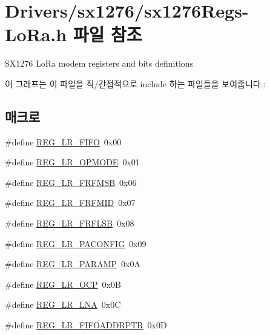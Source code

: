 \hypertarget{sx1276_regs-_lo_ra_8h}{}\section{Drivers/sx1276/sx1276\+Regs-\/\+Lo\+Ra.h 파일 참조}
\label{sx1276_regs-_lo_ra_8h}


S\+X1276 Lo\+Ra modem registers and bits definitions  


이 그래프는 이 파일을 직/간접적으로 include 하는 파일들을 보여줍니다.\+:
\subsection*{매크로}
\begin{DoxyCompactItemize}
\item 
\#define \mbox{\hyperlink{sx1276_regs-_lo_ra_8h_a0f3e3ea7703c7cb55e2fa4c02ebc6edb}{R\+E\+G\+\_\+\+L\+R\+\_\+\+F\+I\+FO}}~0x00
\item 
\#define \mbox{\hyperlink{sx1276_regs-_lo_ra_8h_ae13863a0cab88f39c29d875010dc5b25}{R\+E\+G\+\_\+\+L\+R\+\_\+\+O\+P\+M\+O\+DE}}~0x01
\item 
\#define \mbox{\hyperlink{sx1276_regs-_lo_ra_8h_a8649d29d6156853059baf0e882ee52ec}{R\+E\+G\+\_\+\+L\+R\+\_\+\+F\+R\+F\+M\+SB}}~0x06
\item 
\#define \mbox{\hyperlink{sx1276_regs-_lo_ra_8h_a63a5c5592931ff821f237f6393b54d95}{R\+E\+G\+\_\+\+L\+R\+\_\+\+F\+R\+F\+M\+ID}}~0x07
\item 
\#define \mbox{\hyperlink{sx1276_regs-_lo_ra_8h_a97328f9a41f18eb8a0888e003104626a}{R\+E\+G\+\_\+\+L\+R\+\_\+\+F\+R\+F\+L\+SB}}~0x08
\item 
\#define \mbox{\hyperlink{sx1276_regs-_lo_ra_8h_a8dfd910a5d3e587f7772052710ac3376}{R\+E\+G\+\_\+\+L\+R\+\_\+\+P\+A\+C\+O\+N\+F\+IG}}~0x09
\item 
\#define \mbox{\hyperlink{sx1276_regs-_lo_ra_8h_a5e5599cfeecea91ca7c5ba1e68c70882}{R\+E\+G\+\_\+\+L\+R\+\_\+\+P\+A\+R\+A\+MP}}~0x0A
\item 
\#define \mbox{\hyperlink{sx1276_regs-_lo_ra_8h_acdfdcf7cfc15f16c5c8d59fee923ca5f}{R\+E\+G\+\_\+\+L\+R\+\_\+\+O\+CP}}~0x0B
\item 
\#define \mbox{\hyperlink{sx1276_regs-_lo_ra_8h_a3a52a9b28aecbdddf291c14fe1b69b68}{R\+E\+G\+\_\+\+L\+R\+\_\+\+L\+NA}}~0x0C
\item 
\#define \mbox{\hyperlink{sx1276_regs-_lo_ra_8h_abdc4c3b5c640a1069f7be689ad5bd908}{R\+E\+G\+\_\+\+L\+R\+\_\+\+F\+I\+F\+O\+A\+D\+D\+R\+P\+TR}}~0x0D

\end{DoxyCompactItemize}
